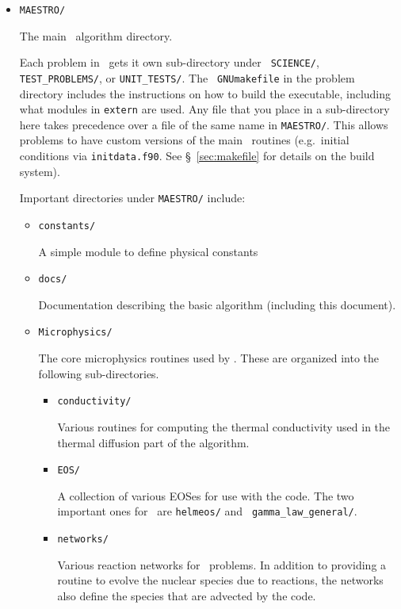\begin{itemize}

\item {\tt MAESTRO/}

  The main \maestro\ algorithm directory.  

  Each problem in \maestro\ gets it own sub-directory under {\tt
    SCIENCE/}, {\tt TEST\_PROBLEMS/}, or {\tt UNIT\_TESTS/}.  The {\tt
    GNUmakefile} in the problem directory includes the instructions on
  how to build the executable, including what modules in {\tt extern}
  are used.  Any file that you place in a sub-directory here takes
  precedence over a file of the same name in {\tt MAESTRO/}.  This
  allows problems to have custom versions of the main
  \maestro\ routines (e.g.\ initial conditions via {\tt initdata.f90}.
  See \S~\ref{sec:makefile} for details on the build system).

  Important directories under {\tt MAESTRO/} include:

  \begin{itemize}

  \item {\tt constants/}

    A simple module to define physical constants

  \item {\tt docs/}

    Documentation describing the basic algorithm (including this
    document).

  \item {\tt Microphysics/}

    The core microphysics routines used by \maestro.  These are organized
    into the following sub-directories.

    \begin{itemize}
    \item {\tt conductivity/}

      Various routines for computing the thermal conductivity used in
      the thermal diffusion part of the algorithm.

    \item {\tt EOS/}

      A collection of various EOSes for use with the code.  The two
      important ones for \maestro\ are {\tt helmeos/} and {\tt
        gamma\_law\_general/}.

    \item {\tt networks/}

      Various reaction networks for \maestro\ problems.  In addition
      to providing a routine to evolve the nuclear species due to
      reactions, the networks also define the species that are
      advected by the code.


\end{itemize}
\end{itemize}
\end{itemize}

